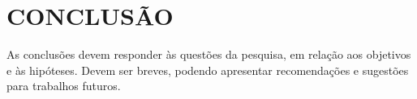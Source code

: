 \section{CONCLUSÃO}

    \hspace{1.5cm} As conclusões devem responder às questões da pesquisa, em relação aos objetivos e às hipóteses. Devem ser breves, podendo apresentar recomendações e sugestões para trabalhos futuros.
